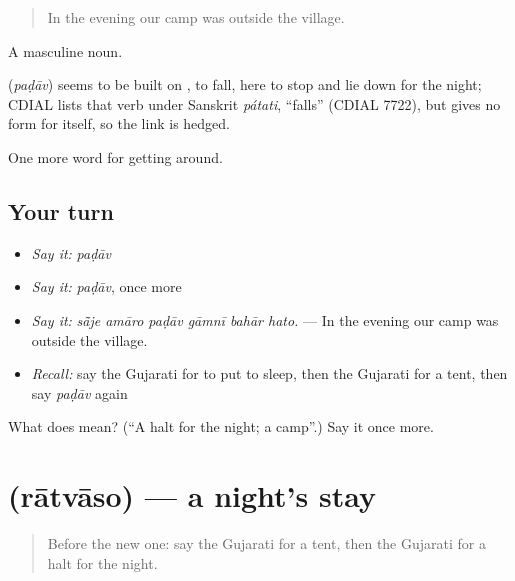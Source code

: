\begin{quote}
In the evening our camp was outside the village.
\end{quote}

A masculine noun.

\begin{cousinweb}
\textbf{} (\emph{paḍāv}) seems to be built on , to fall, here to stop and lie down for the night; CDIAL lists that verb under Sanskrit \emph{pátati}, \textquotedblleft{}falls\textquotedblright{} (CDIAL 7722), but gives no form for  itself, so the link is hedged.
\end{cousinweb}

\begin{grammarlens}[title={What you've built}]
One more word for getting around.
\end{grammarlens}

\subsection*{Your turn}
\begin{itemize}
\raggedright
  \item \emph{Say it:} \emph{paḍāv}
  \item \emph{Say it:} \emph{paḍāv}, once more
  \item \emph{Say it:} \emph{sā̃je amāro paḍāv gāmnī bahār hato.} — In the evening our camp was outside the village.
  \item \emph{Recall:} say the Gujarati for to put to sleep, then the Gujarati for a tent, then say \emph{paḍāv} again
\end{itemize}

\begin{tcolorbox}[breakable,colback=teal!4,colframe=teal!35!black,title={Before you move on}]
What does  mean? (\textquotedblleft{}A halt for the night; a camp\textquotedblright{}.) Say it once more.
\end{tcolorbox}
\section[\texorpdfstring{\gu{રાતવાસો} (rātvāso)}{રાતવાસો (rātvāso)}]{ (rātvāso) — a night's stay}

\label{lesson:GU-C412-ratvaso}



\begin{quote}
Before the new one: say the Gujarati for a tent, then the Gujarati for a halt for the night.
\end{quote}

